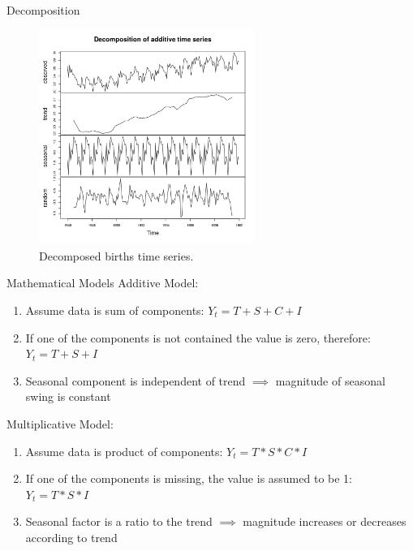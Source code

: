 \documentclass{beamer}
\begin{document}
\begin{frame}{Decomposition}
\begin{figure}
\centering
\includegraphics[width=7cm]{birthstimeseriescomponents}
\caption{Decomposed births time series.}
\end{figure}
\end{frame}

\begin{frame}{Mathematical Models}
Additive Model:
\begin{enumerate}
\item Assume data is sum of components: $Y_t = T + S + C + I$
\item If one of the components is not contained the value is zero, therefore: $Y_t = T + S + I$
\item Seasonal component is independent of trend $\implies$ magnitude of seasonal swing is constant
\end{enumerate}
Multiplicative Model:
\begin{enumerate}
\item Assume data is product of components: $Y_t = T * S * C * I$
\item If one of the components is missing, the value is assumed to be 1: $Y_t = T * S * I$
\item Seasonal factor is a ratio to the trend $\implies$ magnitude increases or decreases according to trend
\end{enumerate}
\end{frame}
\end{document}
